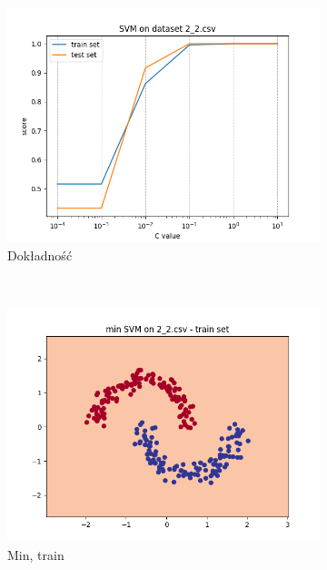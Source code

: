 \documentclass[12pt]{article}
\newcommand*{\subfigwidth}{0.24\textwidth}
\begin{document}
\begin{figure}[H]\centering
    \begin{subfigure}[t]{\subfigwidth}
        \includegraphics[width=\linewidth]{img/exp_2/svm/2_2/accuracy.png}
        \caption{Dokładność}
    \end{subfigure}
    \\
    \begin{subfigure}[t]{\subfigwidth}
        \includegraphics[width=\linewidth]{img/exp_2/svm/2_2/min/train_boundary.png}
        \caption{Min, train}
    \end{subfigure}
    \hfill
    \begin{subfigure}[t]{\subfigwidth}

\end{subfigure}
\end{figure}
\end{document}
